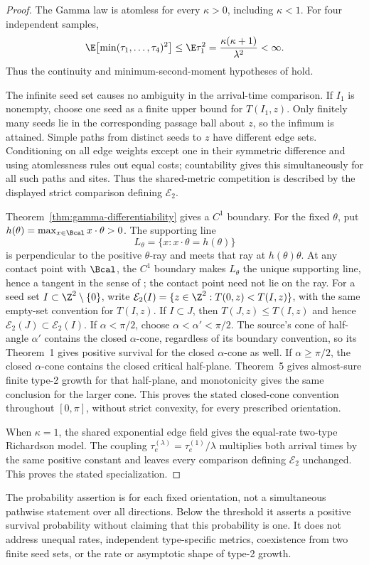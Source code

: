 \begin{proof}
The Gamma law is atomless for every $\kappa>0$, including $\kappa<1$.
For four independent samples,
\[
 \E\bigl[\min(\tau_1,\ldots,\tau_4)^2\bigr]
 \le \E\tau_1^2
 =\frac{\kappa(\kappa+1)}{\lambda^2}<\infty.
\]
Thus the continuity and minimum-second-moment hypotheses of
\cite[Theorem~1]{ADS2026} hold.

The infinite seed set causes no ambiguity in the arrival-time comparison.
If $I_1$ is nonempty, choose one seed as a finite upper bound for
$T(I_1,z)$. Only finitely many seeds lie in the corresponding passage
ball about $z$, so the infimum is attained. Simple paths from distinct
seeds to $z$ have different edge sets. Conditioning on all edge weights
except one in their symmetric difference and using atomlessness rules
out equal costs;
countability gives this simultaneously for all such paths and sites.
Thus the shared-metric competition is described by the displayed strict
comparison defining $\mathcal E_2$.

Theorem~\ref{thm:gamma-differentiability} gives a $C^1$ boundary.
For the fixed $\theta$, put
$h(\theta)=\max_{x\in\Bcal}x\cdot\theta>0$. The supporting line
\[
 L_\theta=\{x:x\cdot\theta=h(\theta)\}
\]
is perpendicular to the positive $\theta$-ray and meets that ray at
$h(\theta)\theta$. At any contact point with $\Bcal$, the $C^1$ boundary
makes $L_\theta$ the unique supporting line, hence a tangent in the
sense of \cite{ADS2026}; the contact point need not lie on the ray.
For a seed set $I\subset\Z^2\setminus\{0\}$, write
$\mathcal E_2(I)=\{z\in\Z^2:T(0,z)<T(I,z)\}$, with the same
empty-set convention for $T(I,z)$. If $I\subset J$, then
$T(J,z)\le T(I,z)$ and hence
$\mathcal E_2(J)\subset\mathcal E_2(I)$. If $\alpha<\pi/2$, choose
$\alpha<\alpha'<\pi/2$. The source's cone of half-angle $\alpha'$
contains the closed $\alpha$-cone, regardless of its boundary convention,
so its Theorem~1 gives positive survival for the closed $\alpha$-cone
as well. If
$\alpha\ge\pi/2$, the closed $\alpha$-cone contains the closed critical
half-plane. Theorem~5 gives almost-sure finite type-2 growth for that
half-plane, and monotonicity gives the same conclusion for the larger
cone. This proves the stated closed-cone convention throughout
$[0,\pi]$, without strict convexity, for every prescribed orientation.

When $\kappa=1$, the shared exponential edge field gives the equal-rate
two-type Richardson model. The coupling
$\tau_e^{(\lambda)}=\tau_e^{(1)}/\lambda$ multiplies both arrival
times by the same positive constant and leaves every comparison
defining $\mathcal E_2$ unchanged. This proves the stated specialization.
\end{proof}

The probability assertion is for each fixed orientation, not a simultaneous
pathwise statement over all directions. Below the threshold it asserts a
positive survival probability without claiming that this probability is one.
It does not address unequal rates, independent type-specific metrics,
coexistence from two finite seed sets, or the rate or asymptotic shape of
type-2 growth.

